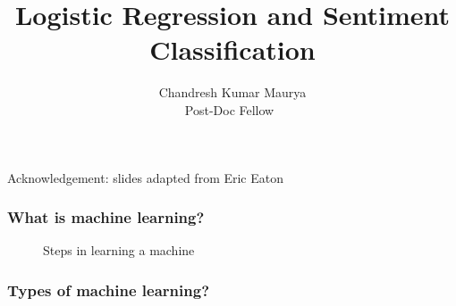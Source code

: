 \documentclass[blue]{beamer}
\title{Logistic Regression and Sentiment Classification }
\author[Chandresh]{Chandresh Kumar Maurya \\  Post-Doc Fellow\ }
\institute{IBM Research, Bangalore}
\begin{document}
\titlepage 
{\footnotesize Acknowledgement: slides adapted from Eric Eaton}

\begin{frame}
\frametitle{What is machine learning?}
\begin{figure}
\caption{Steps in learning a machine}
\end{figure}


\end{frame}
\begin{frame}
\frametitle{Types of machine learning?}
\begin{figure}

\end{figure}


\end{frame}



%
%
%
\end{document}

